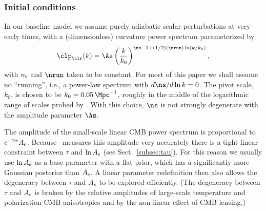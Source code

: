 \subsubsection{Initial conditions}

In our baseline model we assume  purely adiabatic scalar perturbations
at very early times, with a (dimensionless) curvature power spectrum parameterized by
\begin{equation}
  \clp_\clr(k) = \As
    \left(\frac{k}{k_0}\right)^{\ns-1+(1/2)(\nrun) \ln(k/k_0)}, \label{PS1}
\end{equation}
with $n_{\rm s}$ and $\nrun$ taken to be constant.  For most of this paper we
shall assume no ``running'', i.e., a power-law spectrum with $d \ns / d\ln k = 0$.
The pivot scale, $k_0$, is chosen to be $k_0=0.05\,\Mpc^{-1}$, roughly in
the middle of the logarithmic range of scales probed by \planck.
With this choice, $\ns$ is not strongly degenerate with the amplitude
parameter $\As$.



The amplitude of the small-scale linear CMB power spectrum is proportional to
$e^{-2\tau}A_{\rm s}$.  Because \planck\ measures this amplitude very
accurately there is  a tight linear constraint between $\tau$ and
$\ln A_{\rm s}$ (see Sect.~\ref{subsec:tau}).
For this reason we usually use $\ln A_{\rm s}$ as a base parameter with
a flat prior, which has a significantly more Gaussian posterior than
$A_{\rm s}$. A linear parameter redefinition then also allows the degeneracy
between $\tau$ and $A_{\rm s}$ to be explored efficiently.
(The degeneracy between $\tau$ and $A_{\rm s}$ is broken by the relative
amplitudes of large-scale temperature and polarization CMB anisotropies and by
the non-linear effect of CMB lensing.)


